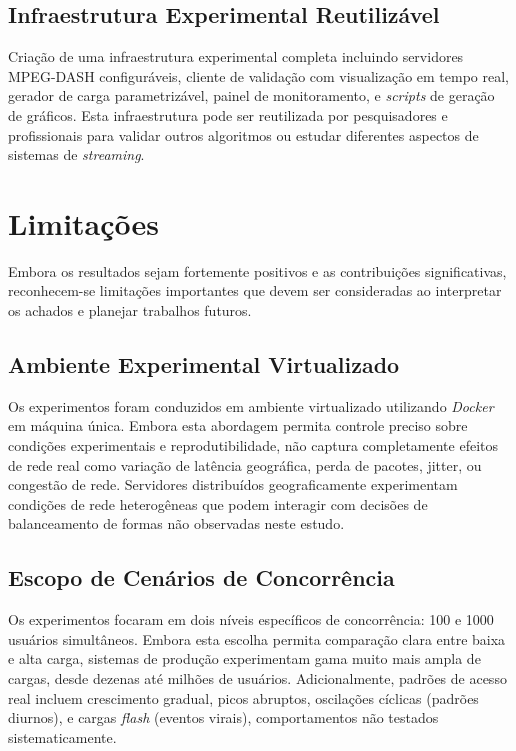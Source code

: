 \subsection{Infraestrutura Experimental Reutilizável}

Criação de uma infraestrutura experimental completa incluindo servidores MPEG-DASH configuráveis, cliente de validação com visualização em tempo real, gerador de carga parametrizável, painel de monitoramento, e \textit{scripts} de geração de gráficos. Esta infraestrutura pode ser reutilizada por pesquisadores e profissionais para validar outros algoritmos ou estudar diferentes aspectos de sistemas de \textit{streaming}.

\section{Limitações}

Embora os resultados sejam fortemente positivos e as contribuições significativas, reconhecem-se limitações importantes que devem ser consideradas ao interpretar os achados e planejar trabalhos futuros.

\subsection{Ambiente Experimental Virtualizado}

Os experimentos foram conduzidos em ambiente virtualizado utilizando \textit{Docker} em máquina única. Embora esta abordagem permita controle preciso sobre condições experimentais e reprodutibilidade, não captura completamente efeitos de rede real como variação de latência geográfica, perda de pacotes, jitter, ou congestão de rede. Servidores distribuídos geograficamente experimentam condições de rede heterogêneas que podem interagir com decisões de balanceamento de formas não observadas neste estudo.

\subsection{Escopo de Cenários de Concorrência}

Os experimentos focaram em dois níveis específicos de concorrência: 100 e 1000 usuários simultâneos. Embora esta escolha permita comparação clara entre baixa e alta carga, sistemas de produção experimentam gama muito mais ampla de cargas, desde dezenas até milhões de usuários. Adicionalmente, padrões de acesso real incluem crescimento gradual, picos abruptos, oscilações cíclicas (padrões diurnos), e cargas \textit{flash} (eventos virais), comportamentos não testados sistematicamente.

